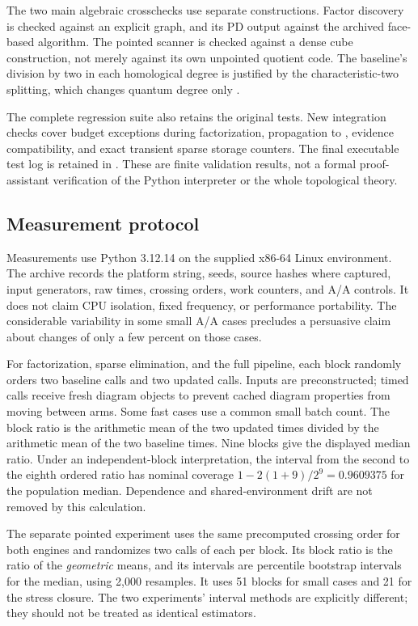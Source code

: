 The two main algebraic crosschecks use separate constructions.  Factor
discovery is checked against an explicit graph, and its PD output against
the archived face-based algorithm.  The pointed scanner is checked against
a dense cube construction, not merely against its own unpointed quotient
code.  The baseline's division by two in each homological degree is justified
by the characteristic-two splitting, which changes quantum degree only
\cite[Corollary~3.2.C]{shumakovitch2014}.

The complete regression suite also retains the original tests.  New
integration checks cover budget exceptions during factorization, propagation
to , evidence compatibility, and exact transient sparse
storage counters.  The final executable test log is retained in
.  These are finite validation results, not a
formal proof-assistant verification of the Python interpreter or the whole
topological theory.

\subsection{Measurement protocol}

Measurements use Python 3.12.14 on the supplied x86-64 Linux environment.
The archive records the platform string, seeds, source hashes where captured,
input generators, raw times, crossing orders, work counters, and A/A controls.
It does not claim CPU isolation, fixed frequency, or performance portability.
The considerable variability in some small A/A cases precludes a persuasive
claim about changes of only a few percent on those cases.

For factorization, sparse elimination, and the full pipeline, each block
randomly orders two baseline calls and two updated calls.  Inputs are
preconstructed; timed calls receive fresh diagram objects to prevent cached
diagram properties from moving between arms.  Some fast cases use a common
small batch count.  The block ratio is the arithmetic mean of the two updated
times divided by the arithmetic mean of the two baseline times.  Nine blocks
give the displayed median ratio.  Under an independent-block interpretation,
the interval from the second to the eighth ordered ratio has nominal
coverage $1-2(1+9)/2^9=0.9609375$ for the population median.  Dependence and
shared-environment drift are not removed by this calculation.

The separate pointed experiment uses the same precomputed crossing order
for both engines and randomizes two calls of each per block.  Its block
ratio is the ratio of the \emph{geometric} means, and its intervals are
percentile bootstrap intervals for the median, using 2,000 resamples.
It uses 51 blocks for small cases and 21 for the stress closure.  The two
experiments' interval methods are explicitly different; they should not be
treated as identical estimators.

